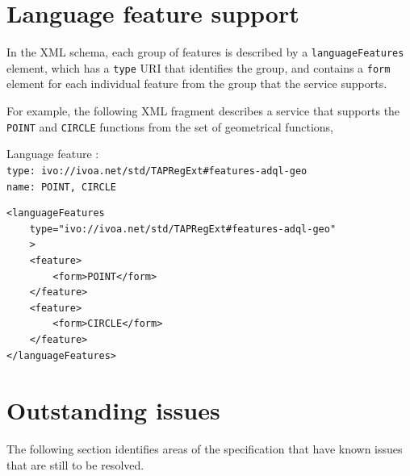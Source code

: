 \documentclass[11pt,a4paper]{ivoa}
\begin{document}
\newpage
\section{Language feature support}
\label{sec:features}

In the \TAPRegSpec XML schema, each group of features is
described by a \verb:languageFeatures: element, which has a \verb:type:
URI that identifies the group, and contains a \verb:form: element for each
individual feature from the group that the service supports.

For example, the following XML fragment describes a service that supports the
\verb:POINT: and \verb:CIRCLE: functions from the set of geometrical functions,

{\footnotesize Language feature :}\\
{\footnotesize \verb|type: ivo://ivoa.net/std/TAPRegExt#features-adql-geo|}\\
{\footnotesize \verb|name: POINT, CIRCLE|}\\

\begin{verbatim}
<languageFeatures
    type="ivo://ivoa.net/std/TAPRegExt#features-adql-geo"
    >
    <feature>
        <form>POINT</form>
    </feature>
    <feature>
        <form>CIRCLE</form>
    </feature>
</languageFeatures>    
\end{verbatim}

\newpage
\section{Outstanding issues}
\label{sec:issues}

The following section identifies areas of the specification that have known
issues that are still to be resolved.
\end{document}

